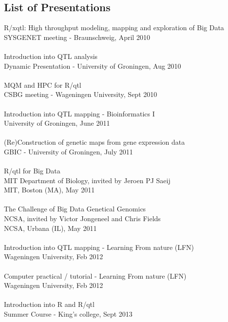 \subsection*{List of Presentations}
R/xqtl: High throughput modeling, mapping and exploration of Big Data\\
SYSGENET meeting - Braunschweig, April 2010\\\\
Introduction into QTL analysis\\
Dynamic Presentation - University of Groningen, Aug 2010\\\\
MQM and HPC for R/qtl\\
CSBG meeting - Wageningen University, Sept 2010\\\\
Introduction into QTL mapping - Bioinformatics I\\
University of Groningen, June 2011\\\\
(Re)Construction of genetic maps from gene expression data\\
GBIC - University of Groningen, July 2011\\\\
R/qtl for Big Data\\
MIT Department of Biology, invited by Jeroen PJ Saeij\\
MIT, Boston (MA), May 2011\\\\
The Challenge of Big Data Genetical Genomics\\
NCSA, invited by Victor Jongeneel and Chris Fields\\
NCSA, Urbana (IL), May 2011\\\\
Introduction into QTL mapping - Learning From nature (LFN)\\
Wageningen University, Feb 2012\\\\
Computer practical / tutorial - Learning From nature (LFN)\\
Wageningen University, Feb 2012\\\\
Introduction into R and R/qtl\\
Summer Course - King's college, Sept 2013\\\\

